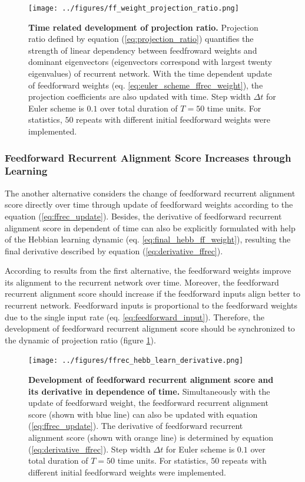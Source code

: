 \documentclass[11pt]{article}
\begin{document}
		\begin{figure}
			\centering
			\texttt{[image: ../figures/ff\_weight\_projection\_ratio.png]}
			\caption{\textbf{Time related development of projection ratio.} Projection ratio defined by equation (\ref{eq:projection_ratio}) quantifies the strength of linear dependency between feedfroward weights and dominant eigenvectors (eigenvectors correspond with largest twenty eigenvalues) of recurrent network. With the time dependent update of feedforward weights (eq. \ref{eq:euler_scheme_ffrec_weight}), the projection coefficients are also updated with time. Step width $\Delta t$ for Euler scheme is $0.1$ over total duration of $T=50$ time units. For statistics, $50$ repeats with different initial feedforward weights were implemented.}
			\label{fig:projection_ratio_in_time}
		\end{figure}
	
	\subsubsection{Feedforward Recurrent Alignment Score Increases through Learning}
	
	The another alternative considers the change of feedforward recurrent alignment score directly over time through update of feedforward weights according to the equation (\ref{eq:ffrec_update}). Besides, the derivative of feedforward recurrent alignment score in dependent of time can also be explicitly formulated with help of the Hebbian learning dynamic (eq. \ref{eq:final_hebb_ff_weight}), resulting the final derivative described by equation (\ref{eq:derivative_ffrec}). 
	
	According to results from the first alternative, the feedforward weights improve its alignment to the recurrent network over time. Moreover, the feedforward recurrent alignment score should increase if the feedforward inputs align better to recurrent network. Feedforward inputs is proportional to the feedforward weights due to the single input rate (eq. \ref{eq:feedforward_input}). Therefore, the development of feedforward recurrent alignment score should be synchronized to the dynamic of projection ratio (figure \ref{fig:projection_ratio_in_time}). 
	
		\begin{figure}
			\centering
			\texttt{[image: ../figures/ffrec\_hebb\_learn\_derivative.png]}
			\caption{\textbf{Development of feedforward recurrent alignment score and its derivative in dependence of time.} Simultaneously with the update of feedforward weight, the feedforward recurrent alignment score (shown with blue line) can also be updated with equation (\ref{eq:ffrec_update}). The derivative of feedforward recurrent alignment score (shown with orange line) is determined by equation (\ref{eq:derivative_ffrec}). Step width $\Delta t$ for Euler scheme is $0.1$ over total duration of $T=50$ time units. For statistics, $50$ repeats with different initial feedforward weights were implemented.}
			\label{fig:ffrec_Hebb_learn}
		\end{figure}
	
\end{document}

